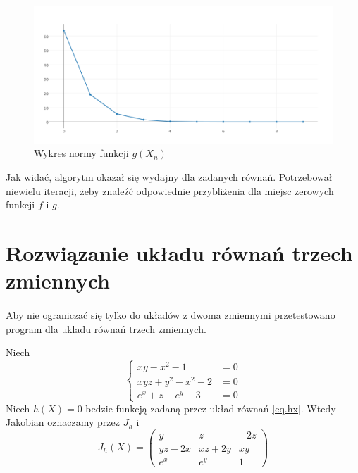 \documentclass{article}
\begin{document}
    \begin{figure}
      \includegraphics[width=\linewidth]{gplot.png}
      \caption{Wykres normy funkcji $g(X_n)$}
      \label{fig:plot2}
    \end{figure}

    Jak widać, algorytm okazał się wydajny dla zadanych równań. Potrzebował niewielu
    iteracji, żeby znaleźć odpowiednie przybliżenia dla miejsc zerowych funkcji
    $f$ i $g$.

  \section{Rozwiązanie układu równań trzech zmiennych}
    \paragraph{} Aby nie ograniczać się tylko do układów z dwoma zmiennymi przetestowano program
    dla ukladu równań trzech zmiennych.

    Niech
    \begin{equation}\label{eq.hx}
      \begin{cases}
        xy - x^2 - 1        &= 0 \\
        xyz + y^2 - x^2 - 2 &= 0 \\
        e^x + z - e^y - 3   &= 0
      \end{cases}
    \end{equation}
    Niech $h(X) = 0$ bedzie funkcją zadaną przez układ równań \eqref{eq.hx}.
    Wtedy Jakobian oznaczamy przez $J_h$ i
    \begin{equation*}
      J_{h}(X) =
      \begin{pmatrix}
        y     & z       & -2z \\
        yz-2x & xz + 2y & xy  \\
        e^x   & e^y     & 1
      \end{pmatrix}
    \end{equation*}
\end{document}
